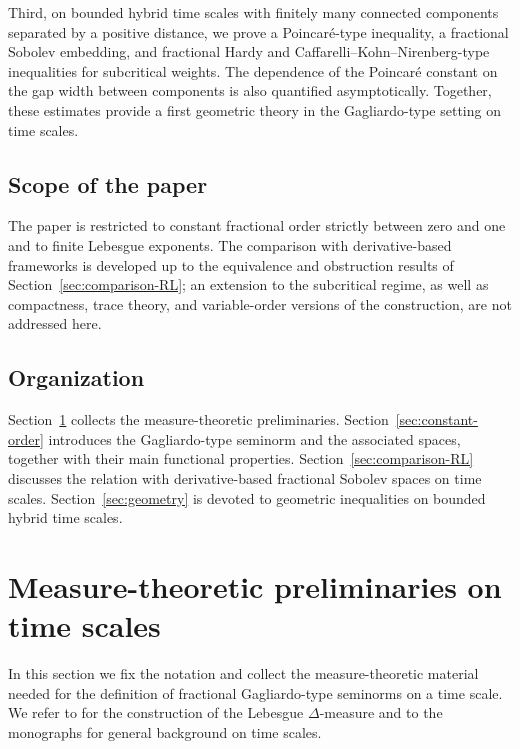 \documentclass[11pt,a4paper]{article}
\numberwithin{equation}{section}
\theoremstyle{definition}
\begin{document}
Third, on bounded hybrid time scales with finitely many connected components separated by a positive distance, we prove a Poincar\'e-type inequality, a fractional Sobolev embedding, and fractional Hardy and Caffarelli--Kohn--Nirenberg-type inequalities for subcritical weights. The dependence of the Poincar\'e constant on the gap width between components is also quantified asymptotically. Together, these estimates provide a first geometric theory in the Gagliardo-type setting on time scales.

\subsection*{Scope of the paper}

The paper is restricted to constant fractional order strictly between zero and one and to finite Lebesgue exponents. The comparison with derivative-based frameworks is developed up to the equivalence and obstruction results of Section~\ref{sec:comparison-RL}; an extension to the subcritical regime, as well as compactness, trace theory, and variable-order versions of the construction, are not addressed here.

\subsection*{Organization}

Section~\ref{sec:preliminaries} collects the measure-theoretic preliminaries. Section~\ref{sec:constant-order} introduces the Gagliardo-type seminorm and the associated spaces, together with their main functional properties. Section~\ref{sec:comparison-RL} discusses the relation with derivative-based fractional Sobolev spaces on time scales. Section~\ref{sec:geometry} is devoted to geometric inequalities on bounded hybrid time scales.


\section{Measure-theoretic preliminaries on time scales}\label{sec:preliminaries}

In this section we fix the notation and collect the measure-theoretic material needed for the definition of fractional Gagliardo-type seminorms on a time scale. We refer to \cite{BohnerGuseinov2006,CabadaVivero2006} for the construction of the Lebesgue $\Delta$-measure and to the monographs \cite{BohnerPeterson2001,BohnerPeterson2003} for general background on time scales.
\end{document}
